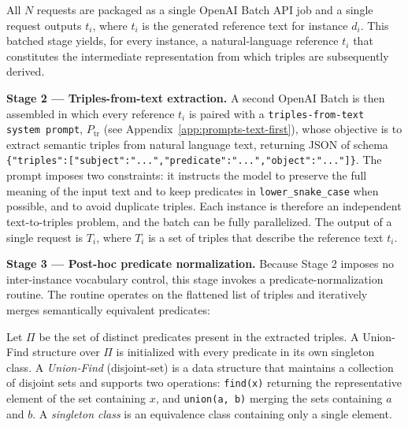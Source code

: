 All $N$ requests are packaged as a single OpenAI Batch API job and a single request outputs $t_i$, where $t_i$ is the generated reference text for instance $d_i$. This batched stage yields, for every instance, a natural-language reference $t_i$ that constitutes the intermediate representation from which triples are subsequently derived.

\textbf{Stage 2 --- Triples-from-text extraction.}
A second OpenAI Batch is then assembled in which every reference $t_i$ is paired with a \texttt{triples-from-text system prompt}, $P_{\mathrm{tr}}$ (see Appendix~\ref{app:prompts-text-first}), whose objective is to extract semantic triples from natural language text, returning JSON of schema \texttt{\{"triples":[{"subject":"...","predicate":"...","object":"..."}]\}}. The prompt imposes two constraints: it instructs the model to preserve the full meaning of the input text and to keep predicates in \texttt{lower\_snake\_case} when possible, and to avoid duplicate triples. Each instance is therefore an independent text-to-triples problem, and the batch can be fully parallelized. The output of a single request is $T_i$, where $T_i$ is a set of triples that describe the reference text $t_i$.

\textbf{Stage 3 --- Post-hoc predicate normalization.}
Because Stage 2 imposes no inter-instance vocabulary control, this stage invokes a predicate-normalization routine. The routine operates on the flattened list of triples and iteratively merges semantically equivalent predicates:

Let $\Pi$ be the set of distinct predicates present in the extracted triples. A Union-Find structure over $\Pi$ is initialized with every predicate in its own singleton class. A \emph{Union-Find} (disjoint-set) is a data structure that maintains a collection of disjoint sets and supports two operations: \texttt{find(x)} returning the representative element of the set containing $x$, and \texttt{union(a, b)} merging the sets containing $a$ and $b$. A \emph{singleton class} is an equivalence class containing only a single element.

